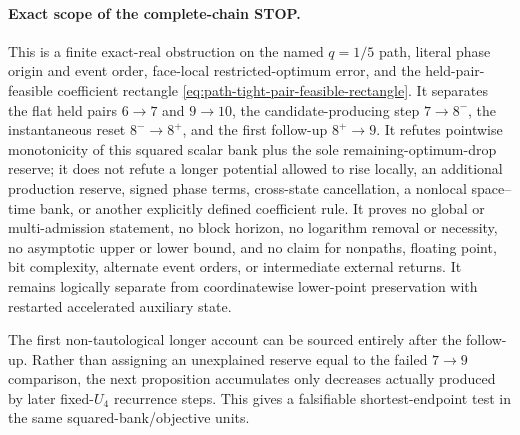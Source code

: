 \paragraph{Exact scope of the complete-chain STOP.}
This is a finite exact-real obstruction on the named $q=1/5$ path, literal
phase origin and event order, face-local restricted-optimum error, and the
held-pair-feasible coefficient rectangle
\cref{eq:path-tight-pair-feasible-rectangle}.  It separates the flat held
pairs $6\to7$ and $9\to10$, the candidate-producing step $7\to8^-$, the
instantaneous reset $8^-\to8^+$, and the first follow-up $8^+\to9$.  It
refutes pointwise monotonicity of this squared scalar bank plus the sole
remaining-optimum-drop reserve; it does not refute a longer potential allowed
to rise locally, an additional production reserve, signed phase terms,
cross-state cancellation, a nonlocal space--time bank, or another explicitly
defined coefficient rule.  It proves no global or multi-admission statement,
no block horizon, no logarithm removal or necessity, no asymptotic upper or
lower bound, and no claim for nonpaths, floating point, bit complexity,
alternate event orders, or intermediate external returns.  It remains
logically separate from coordinatewise lower-point preservation with restarted
accelerated auxiliary state.

The first non-tautological longer account can be sourced entirely after the
follow-up.  Rather than assigning an unexplained reserve equal to the failed
$7\to9$ comparison, the next proposition accumulates only decreases actually
produced by later fixed-$U_4$ recurrence steps.  This gives a falsifiable
shortest-endpoint test in the same squared-bank/objective units.

